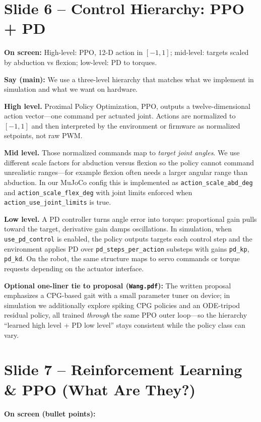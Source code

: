 \documentclass[11pt]{article}
\begin{document}
\section{Slide 6 -- Control Hierarchy: PPO + PD}
\textbf{On screen:} High-level: PPO, 12-D action in $[-1,1]$; mid-level: targets scaled by abduction vs flexion; low-level: PD to torques.

\textbf{Say (main):}
We use a three-level hierarchy that matches what we implement in simulation and what we want on hardware.

\textbf{High level.}
Proximal Policy Optimization, PPO, outputs a twelve-dimensional action vector---one command per actuated joint. Actions are normalized to $[-1,1]$ and then interpreted by the environment or firmware as normalized setpoints, not raw PWM.

\textbf{Mid level.}
Those normalized commands map to \emph{target joint angles}. We use different scale factors for abduction versus flexion so the policy cannot command unrealistic ranges---for example flexion often needs a larger angular range than abduction. In our MuJoCo config this is implemented as \texttt{action\_scale\_abd\_deg} and \texttt{action\_scale\_flex\_deg} with joint limits enforced when \texttt{action\_use\_joint\_limits} is true.

\textbf{Low level.}
A PD controller turns angle error into torque: proportional gain pulls toward the target, derivative gain damps oscillations. In simulation, when \texttt{use\_pd\_control} is enabled, the policy outputs targets each control step and the environment applies PD over \texttt{pd\_steps\_per\_action} substeps with gains \texttt{pd\_kp}, \texttt{pd\_kd}. On the robot, the same structure maps to servo commands or torque requests depending on the actuator interface.

\textbf{Optional one-liner tie to proposal (\texttt{Wang.pdf}):}
The written proposal emphasizes a CPG-based gait with a small parameter tuner on device; in simulation we additionally explore spiking CPG policies and an ODE-tripod residual policy, all trained \emph{through} the same PPO outer loop---so the hierarchy ``learned high level + PD low level'' stays consistent while the policy class can vary.

\section{Slide 7 -- Reinforcement Learning \& PPO (What Are They?)}
\textbf{On screen (bullet points):}
\end{document}
